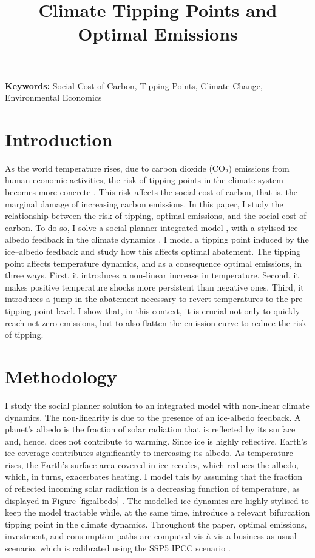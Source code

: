 \documentclass[12pt]{article}
\title{Climate Tipping Points and Optimal Emissions}
\author{} %
\date{} %
\begin{document}
\maketitle

\textbf{Keywords:} Social Cost of Carbon, Tipping Points, Climate Change, Environmental Economics

\section{Introduction}

As the world temperature rises, due to carbon dioxide (CO$_2$) emissions from human economic activities, the risk of tipping points in the climate system becomes more concrete \citep{ashwin_extreme_2020,sledd_cloudier_2021}. This risk affects the social cost of carbon, that is, the marginal damage of increasing carbon emissions. In this paper, I study the relationship between the risk of tipping, optimal emissions, and the social cost of carbon. To do so, I solve a social-planner integrated model \citep{hambel_optimal_2021}, with a stylised ice-albedo feedback in the climate dynamics \citep{hogg_glacial_2008,ashwin_tipping_2012}. I model a tipping point induced by the ice–albedo feedback and study how this affects optimal abatement. The tipping point affects temperature dynamics, and as a consequence optimal emissions, in three ways. First, it introduces a non-linear increase in temperature. Second, it makes positive temperature shocks more persistent than negative ones. Third, it introduces a jump in the abatement necessary to revert temperatures to the pre-tipping-point level. I show that, in this context, it is crucial not only to quickly reach net-zero emissions, but to also flatten the emission curve to reduce the risk of tipping.

\section{Methodology}

I study the social planner solution to an integrated model with non-linear climate dynamics. The non-linearity is due to the presence of an ice-albedo feedback. A planet's albedo is the fraction of solar radiation that is reflected by its surface and, hence, does not contribute to warming. Since ice is highly reflective, Earth's ice coverage contributes significantly to increasing its albedo. As temperature rises, the Earth's surface area covered in ice recedes, which reduces the albedo, which, in turns, exacerbates heating. I model this by assuming that the fraction of reflected incoming solar radiation is a decreasing function of temperature, as displayed in Figure \ref{fig:albedo} \citep{oerlemans_ice_1984, mendez_investigating_2021}. The modelled ice dynamics are highly stylised to keep the model tractable while, at the same time, introduce a relevant bifurcation tipping point in the climate dynamics. Throughout the paper, optimal emissions, investment, and consumption paths are computed vis-à-vis a business-as-usual scenario, which is calibrated using the SSP5 IPCC scenario \citep{kriegler_fossil-fueled_2017}.
\end{document}
